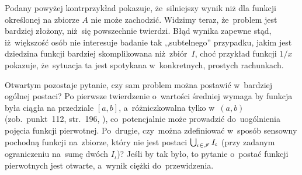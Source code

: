 \documentclass[a4paper,11pt]{article}
\begin{document}
Podany powyżej kontrprzykład pokazuje, że~silniejszy wynik niż dla
funkcji określonej na zbiorze $A$ nie może zachodzić. Widzimy teraz,
że~problem jest bardziej złożony, niż~się powszechnie twierdzi. Błąd
wynika zapewne stąd, iż~większość osób nie interesuje badanie tak
,,subtelnego'' przypadku, jakim jest dziedzina funkcji bardziej
skomplikowana niż~zbiór~$I$, choć przykład funkcji $1 / x$ pokazuje,
że~sytuacja ta jest spotykana w~konkretnych, prostych rachunkach.

Otwartym pozostaje pytanie, czy sam problem można postawić w~bardziej
ogólnej postaci? Po pierwsze twierdzenie o~wartości średniej wymaga by
funkcja była ciągła na przedziale $[ a, b ]$, a~różniczkowalna tylko
w~$( a, b )$ (zob.~punkt~112, str.~196,
\cite{FichtenholzRachunekRiCTomI2005}), co~potencjalnie może prowadzić
do~uogólnienia pojęcia funkcji pierwotnej. Po~drugie, czy~można
zdefiniować w~sposób sensowny pochodną funkcji na~zbiorze, który nie
jest postaci $\bigcup_{ \iota \in \mathcal{I} } I_{ \iota }$ (przy zadanym
ograniczeniu na~sumę dwóch $I_{ \iota }$)? Jeśli by tak było, to
pytanie o~postać funkcji pierwotnych jest otwarte, a~wynik ciężki
do~przewidzenia.

\vspace{\spaceFour}



\end{document}
